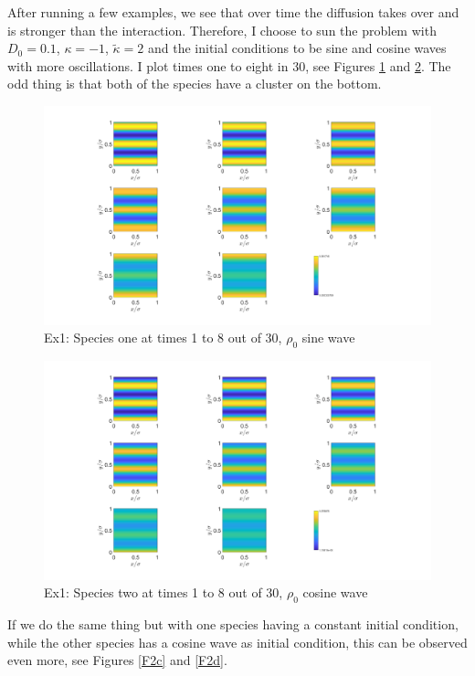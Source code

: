 \documentclass[11pt, a4paper]{article}
\theoremstyle{definition}
\begin{document}
	After running a few examples, we see that over time the diffusion takes over and is stronger than the interaction. Therefore, I choose to sun the problem with $D_0 = 0.1$, $\kappa = -1$, $\tilde \kappa = 2$ and the initial conditions to be sine and cosine waves with more oscillations. I plot times one to eight in $30$, see Figures \ref{F2a} and \ref{F2b}. The odd thing is that both of the species have a cluster on the bottom.
	\begin{figure}[h]
	\centering
	\includegraphics[scale=0.25]{Weird1.png}
	\caption{Ex1: Species one at times 1 to 8 out of 30, $\rho_0$ sine wave} 
	\label{F2a}
	\end{figure}
	\begin{figure}[h]
		\centering
		\includegraphics[scale=0.25]{Weird2.png}
		\caption{Ex1: Species two at times 1 to 8 out of 30, $\rho_0$ cosine wave} 
		\label{F2b}
	\end{figure}
	If we do the same thing but with one species having a constant initial condition, while the other species has a cosine wave as initial condition, this can be observed even more, see Figures \ref{F2c} and \ref{F2d}.
\end{document}
